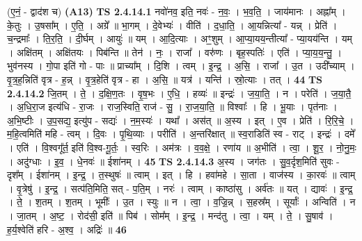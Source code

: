 \documentclass[17pt]{extarticle}
\begin{document}
                  \newline
                      (ए॒नं॒ - द्वाद॑श च)  \textbf{(A13)} \newline \newline
                                \textbf{ TS 2.4.14.1} \newline
                  नवो॑नव॒ इति॒ नवः॑ - न॒वः॒ । भ॒व॒ति॒ । जाय॑मानः । अह्ना᳚म् । के॒तुः । उ॒षसा᳚म् । ए॒ति॒ । अग्रे᳚ ॥ भा॒गम् । दे॒वेभ्यः॑ । वीति॑ । द॒धा॒ति॒ । आ॒यन्नित्या᳚ - यन्न् । प्रेति॑ । च॒न्द्रमाः᳚ । ति॒र॒ति॒ । दी॒र्घम् । आयुः॑ ॥ यम् । आ॒दि॒त्याः । अꣳ॒॒शुम् । आ॒प्या॒यय॒न्तीत्या᳚ - प्या॒यय॑न्ति । यम् । अक्षि॑तम् । अक्षि॑तयः । पिब॑न्ति ॥ तेन॑ । नः॒ । राजा᳚ । वरु॑णः । बृह॒स्पतिः॑ । एति॑ । प्या॒य॒य॒न्तु॒ । भुव॑नस्य । गो॒पा इति॑ गो - पाः ॥ प्राच्या᳚म् । दि॒शि । त्वम् । इ॒न्द्र॒ । अ॒सि॒ । राजा᳚ । उ॒त । उदी᳚च्याम् । वृ॒त्र॒ह॒न्निति॑ वृत्र - ह॒न्न् । वृ॒त्र॒हेति॑ वृत्र - हा । अ॒सि॒ ॥ यत्र॑ । यन्ति॑ । स्रो॒त्याः । तत् । \textbf{  44} \newline
                  \newline
                                \textbf{ TS 2.4.14.2} \newline
                  जि॒तम् । ते॒ । द॒क्षि॒ण॒तः । वृ॒ष॒भः । ए॒धि॒ । हव्यः॑ ॥ इन्द्रः॑ । ज॒या॒ति॒ । न । परेति॑ । ज॒या॒तै॒ । अ॒धि॒रा॒ज इत्य॑धि - रा॒जः । राज॒स्विति॒ राज॑ - सु॒ । रा॒ज॒या॒ति॒ ॥ विश्वाः᳚ । हि । भू॒याः । पृत॑नाः । अ॒भि॒ष्टीः । उ॒प॒सद्य॒ इत्यु॑प - सद्यः॑ । न॒म॒स्यः॑ । यथा᳚ । अस॑त् ॥ अ॒स्य । इत् । ए॒व । प्रेति॑ । रि॒रि॒चे॒ । म॒हि॒त्वमिति॑ महि - त्वम् । दि॒वः । पृ॒थि॒व्याः । परीति॑ । अ॒न्तरि॑क्षात् ॥ स्व॒राडिति॑ स्व - राट् । इन्द्रः॑ । दमे᳚ । एति॑ । वि॒श्वगू᳚र्त॒ इति॑ वि॒श्व-गू॒र्तः॒ । स्व॒रिः । अम॑त्रः । व॒व॒क्षे॒ ।    रणा॑य ॥ अ॒भीति॑ । त्वा॒ । शू॒र॒ । नो॒नु॒मः॒ । अदु॑ग्धाः । इ॒व॒ । धे॒नवः॑ ॥ ईशा॑नम् । \textbf{  45} \newline
                  \newline
                                \textbf{ TS 2.4.14.3} \newline
                  अ॒स्य । जग॑तः । सु॒व॒र्दृश॒मिति॑ सुवः - दृश᳚म् । ईशा॑नम् । इ॒न्द्र॒ । त॒स्थुषः॑ ॥ त्वाम् । इत् । हि । हवा॑महे । सा॒ता । वाज॑स्य । का॒रवः॑ ॥ त्वाम् । वृ॒त्रेषु॑ । इ॒न्द्र॒ । सत्प॑ति॒मिति॒ सत् - प॒ति॒म् । नरः॑ । त्वाम् । काष्ठा॑सु । अर्व॑तः ॥ यत् । द्यावः॑ । इ॒न्द्र॒ । ते॒ । श॒तम् । श॒तम् । भूमीः᳚ । उ॒त । स्युः ॥ न । त्वा॒ । व॒ज्रि॒न्न् । स॒हस्र᳚म् । सूर्याः᳚ । अन्विति॑ ।   न । जा॒तम् । अ॒ष्ट॒ । रोद॑सी॒ इति॑ ॥ पिब॑ । सोम᳚म् । इ॒न्द्र॒ । मन्द॑तु । त्वा॒ । यम् । ते॒ । सु॒षाव॑ । ह॒र्य॒श्वेति॑ हरि - अ॒श्व॒ । अद्रिः॑ ॥ \textbf{  46} \newline
\end{document}
